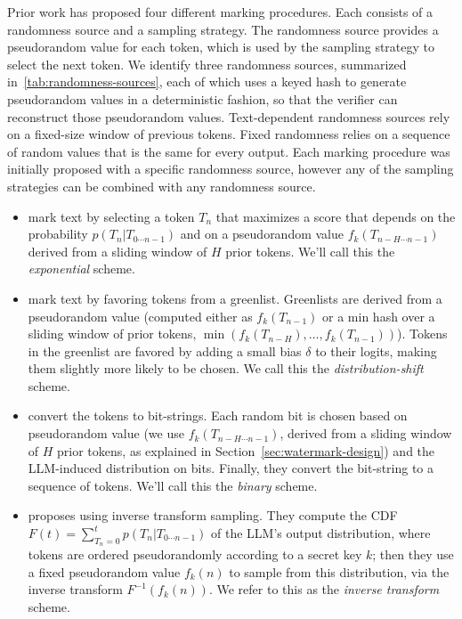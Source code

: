 Prior work has proposed four different marking procedures.
Each consists of a randomness source and a sampling strategy.
The randomness source provides a pseudorandom value for each token, which is used by the sampling strategy to select the next token.
We identify three randomness sources, summarized in~\cref{tab:randomness-sources}, each of which uses a keyed hash to generate pseudorandom values in a deterministic fashion, so that the verifier can reconstruct those pseudorandom values.
Text-dependent randomness sources rely on a fixed-size window of previous tokens.
Fixed randomness relies on a sequence of random values that is the same for every output.
Each marking procedure was initially proposed with a specific 
randomness source, however any of the sampling strategies can be combined with any randomness source. 
%
\begin{itemize}[leftmargin=*]
    \item {\bf \citet{aaronson_watermarking_2022}} mark text by selecting a token $T_n$ that 
    maximizes a score that depends on the probability $p(T_n|T_{0 \cdots n-1})$ and on a pseudorandom value $f_k(T_{n-H \cdots n-1})$ derived from a sliding window of $H$ prior tokens.
    We'll call this the \emph{exponential} scheme.
    \item {\bf \citet{kirchenbauer_watermark_2023}} mark text by favoring tokens from a greenlist. 
    Greenlists are derived from a pseudorandom value (computed either as $f_k(T_{n-1})$ or a min hash over a sliding window of prior tokens, $\min(f_k(T_{n-H}),\dots,f_k(T_{n-1}))$).
    Tokens in the greenlist are favored by adding a small bias $\delta$ to their logits, making them slightly more likely to be chosen.
    We call this the \emph{distribution-shift} scheme.
    \item {\bf \citet{christ_undetectable_2023}} convert the tokens to bit-strings.
    Each random bit is chosen based on pseudorandom value (we use $f_k(T_{n-H \cdots n-1})$, derived from a sliding window of $H$ prior tokens, as explained in Section~\ref{sec:watermark-design}) and the LLM-induced distribution on bits.
    Finally, they convert the bit-string to a sequence of tokens.
    We'll call this the \emph{binary} scheme.
    \item {\bf \citet{kuditipudi_robust_2023}} proposes using inverse transform sampling.
    They compute the CDF $F(t) = \sum_{T_n=0}^t p(T_n|T_{0 \cdots n-1})$ of the LLM's output distribution, where tokens are ordered pseudorandomly according to a secret key $k$; then they use a fixed pseudorandom value $f_k(n)$ to sample from this distribution, via the inverse transform $F^{-1}(f_k(n))$.
    We refer to this as the \emph{inverse transform} scheme.
\end{itemize}

